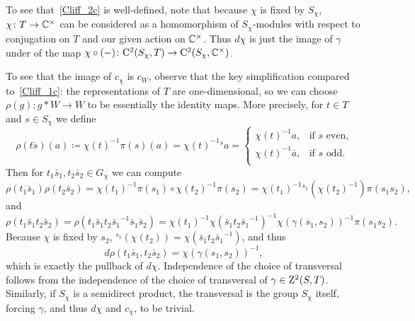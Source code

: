 \begin{just}    
  To see that~\eqref{Cliff_2c} is well-defined, note that because $\chi$ is fixed by $S_{\chi}$, $\chi \colon T \rightarrow {\mathbb C}^{\times}$ can be considered as a homomorphism of $S_{\chi}$-modules with respect to conjugation on $T$ and our given action on ${\mathbb C}^{\times}$. Thus $d \chi$ is just the image of $\gamma$ under of the map $ \chi \circ (-) \colon \mathrm{C}^2(S_{\chi},T) \rightarrow \mathrm{C}^2(S_{\chi},{\mathbb C}^{\times})$.

  To see that the image of $c_{\chi}$ is $c_W$, observe that the key simplification compared to~\eqref{Cliff_1c}: the representations of $T$ are one-dimensional, so we can choose $\rho (g): g * W \to W$ to be essentially the identity maps. More precisely, for $t \in T$ and $s \in S_{\chi}$ we define
  \begin{equation} \label{Cliff_2g}
    \rho (t \breve{s}) (a) \coloneqq \chi(t)^{-1} \pi(s)(a) = \chi(t)^{-1} {}^{s}a
 =
  \begin{cases}
    \chi(t)^{-1} a , & \text{if $s$ even,}\\
    \chi(t)^{-1} \overline{a} , & \text{if $s$ odd.}\\
  \end{cases}
  \end{equation}
Then for $t_1 \breve{s_1}, t_2 \breve{s_2} \in G_{\chi}$ we can compute
\[
\rho(t_1 \breve{s_1}) \rho(t_2 \breve{s_2}) = \chi(t_1)^{-1} \pi(s_1) \circ \chi(t_2)^{-1} \pi(s_2) = \chi(t_1)^{-1} {}^{s_1}(\chi(t_2)^{-1}) \pi(s_1s_2),
\]
and
\[
\rho(t_1 \breve{s_1} t_2 \breve{s_2}) = \rho(t_1 \breve{s_1}t_2\breve{s_1}^{-1} \breve{s_1} \breve{s_2}) = \chi(t_1)^{-1} \chi( \breve{s_1}t_2\breve{s_1}^{-1})^{-1} \chi(\gamma(s_1,s_2))^{-1} \pi( s_1 s_2).
\]
Because $\chi$ is fixed by $s_2$, ${}^{s_1}(\chi(t_2)) = \chi( \breve{s_1}t_2\breve{s_1}^{-1})$, and thus
\[
d \rho(t_1 \breve{s_1}, t_2 \breve{s_2}) = \chi(\gamma(s_1,s_2))^{-1},
\]
which is exactly the pullback of $d \chi$. Independence of the choice of transversal follows from the independence of the choice of transversal of $\gamma \in \mathrm{Z}^2 (S, T)$. Similarly, if $S_\chi$ is a semidirect product, the transversal is the group $S_\chi$ itself, forcing $\gamma$, and thus $d\chi$ and $c_\chi$, to be trivial.
\end{just}    
  
